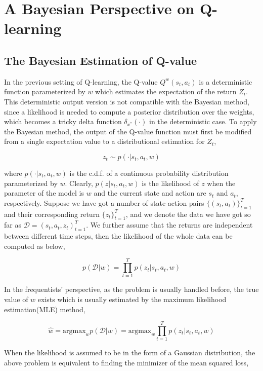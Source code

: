 \documentclass[a4paper,12pt]{article}
\begin{document}
\section{A Bayesian Perspective on Q-learning}
\subsection{The Bayesian Estimation of Q-value}
In the previous setting of Q-learning, the Q-value $Q^w(s_t, a_t)$ is a deterministic function parameterized by $w$ which estimates the expectation of the return $Z_t$. This deterministic output version is not compatible with the Bayesian method, since a likelihood is needed to compute a posterior distribution over the weights, which becomes a tricky delta function $\delta_{x^*}(\cdot)$ in the deterministic case. To apply the Bayesian method, the output of the Q-value function must first be modified from a single expectation value to a distributional estimation for $Z_t$, 

\begin{equation}
z_t \sim p(\cdot | s_t, a_t, w)
\end{equation}

where $p(\cdot | s_t, a_t, w)$ is the c.d.f. of a continuous probability distribution parameterized by $w$. Clearly, $p(z | s_t, a_t, w)$ is the likelihood of $z$ when the parameter of the model is $w$ and the current state and action are $s_t$ and $a_t$, respectively. Suppose we have got a number of state-action pairs $\{(s_t, a_t)\}_{t=1}^T$ and their corresponding return $\{z_t\}_{t=1}^T$, and we denote the data we have got so far as $\mathcal{D} = {(s_t, a_t, z_t)}_{t=1}^T$. We further assume that the returns are independent between different time steps, then the likelihood of the whole data can be computed as below, 

\begin{equation}
p(\mathcal{D} | w) = \prod_{t=1}^T p(z_t | s_t, a_t, w)
\end{equation}

In the frequentists' perspective, as the problem is usually handled before, the true value of $w$ exists which is usually estimated by the maximum likelihood estimation(MLE) method, 

\begin{equation}
\hat{w} = \textrm{argmax}_w p(\mathcal{D} | w) =\textrm{argmax}_w\prod_{t=1}^T p(z_t | s_t, a_t, w)
\end{equation}

When the likelihood is assumed to be in the form of a Gaussian distribution, the above problem is equivalent to finding the minimizer of the mean squared loss, 
\end{document}
